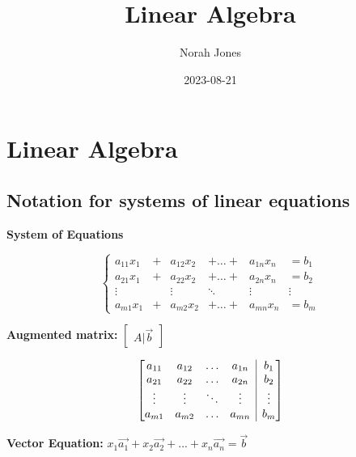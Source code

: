 \documentclass[
  letterpaper,
  DIV=11,
  numbers=noendperiod]{scrreprt}
\title{Linear Algebra}
\author{Norah Jones}
\date{2023-08-21}
\renewcommand*\contentsname{Table of contents}
\newcommand\contentsname{Table of contents}
\begin{document}
\maketitle
\renewcommand*\contentsname{Table of contents}
{
\hypersetup{linkcolor=}
\setcounter{tocdepth}{2}
\tableofcontents
}

\hypertarget{linear-algebra}{%
\chapter*{Linear Algebra}\label{linear-algebra}}


\hypertarget{notation-for-systems-of-linear-equations}{%
\section*{Notation for systems of linear
equations}\label{notation-for-systems-of-linear-equations}}


\textbf{System of Equations}

\[
\begin{cases}
a_{11}x_1 & + &a_{12}x_2 &+ \dots+ & a_{1n}x_n &= b_1 \\
a_{21}x_1 & + &a_{22}x_2 &+ \dots+ & a_{2n}x_n &= b_2 \\
\vdots && \vdots & \ddots & \vdots & \vdots \\
a_{m1}x_1 & + &a_{m2}x_2 &+ \dots+ & a_{mn}x_n &= b_m
\end{cases}
\]

\textbf{Augmented matrix:} \(\begin{bmatrix}A|\vec{b}\end{bmatrix}\)

\[
\left[\begin{array}{@{}cccc|c@{}}
a_{11} & a_{12} & \dots & a_{1n} & b_1 \\
a_{21} & a_{22} & \dots & a_{2n} & b_2 \\
\vdots & \vdots & \ddots & \vdots & \vdots \\
a_{m1} & a_{m2} & \dots & a_{mn} & b_m
\end{array}\right]
\]

\textbf{Vector Equation:}
\(x_1\vec{a_1}+x_2\vec{a_2}+...+x_n\vec{a_n}=\vec{b}\)
\end{document}
